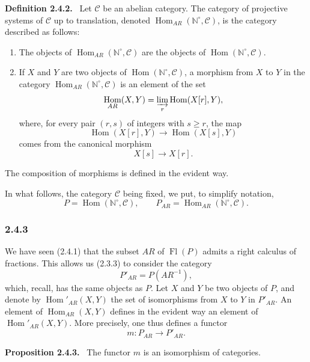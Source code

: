 \documentclass[11pt]{article}
\providecommand{\NN}{\mathbb{N}}
\newenvironment{statement}[1]{\par\medskip\noindent\textbf{#1.}\ }{\par\medskip}
\DeclareMathOperator{\Hom}{Hom}
\providecommand{\Hom}{\operatorname{Hom}}
\providecommand{\Fl}{\operatorname{Fl}}
\providecommand{\NN}{\mathbb N}
\providecommand{\cC}{\mathcal C}
\begin{document}
\begin{statement}{Definition 2.4.2}
Let $\cC$ be an abelian category. The category of projective systems of $\cC$ up to translation, denoted $\Hom_{AR}(\NN^\circ,\cC)$, is the category described as follows:
\begin{enumerate}[label=(\roman*)]
\item The objects of $\Hom_{AR}(\NN^\circ,\cC)$ are the objects of $\Hom(\NN^\circ,\cC)$.
\item If $X$ and $Y$ are two objects of $\Hom(\NN^\circ,\cC)$, a morphism from $X$ to $Y$ in the category $\Hom_{AR}(\NN^\circ,\cC)$ is an element of the set
\[
\Hom_{AR}(X,Y)=\varinjlim_r\Hom(X[r],Y),
\]
where, for every pair $(r,s)$ of integers with $s\ge r$, the map
\[
\Hom(X[r],Y)\longrightarrow\Hom(X[s],Y)
\]
comes from the canonical morphism
\[
X[s]\longrightarrow X[r].
\]
\end{enumerate}
The composition of morphisms is defined in the evident way.
\end{statement}
In what follows, the category $\cC$ being fixed, we put, to simplify notation,
\[
P=\Hom(\NN^\circ,\cC),\qquad P_{AR}=\Hom_{AR}(\NN^\circ,\cC).
\]

\subsubsection*{2.4.3}
We have seen (2.4.1) that the subset $AR$ of $\Fl(P)$ admits a right calculus of fractions. This allows us (2.3.3) to consider the category
\[
P'_{AR}=P(AR^{-1}),
\]
which, recall, has the same objects as $P$. Let $X$ and $Y$ be two objects of $P$, and denote by $\Hom'_{AR}(X,Y)$ the set of isomorphisms from $X$ to $Y$ in $P'_{AR}$. An element of $\Hom_{AR}(X,Y)$ defines in the evident way an element of $\Hom'_{AR}(X,Y)$. More precisely, one thus defines a functor
\[
m:P_{AR}\longrightarrow P'_{AR}.
\]

\begin{statement}{Proposition 2.4.3}
The functor $m$ is an isomorphism of categories.
\end{statement}
\end{document}
